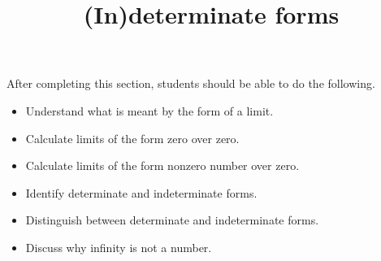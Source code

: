 \documentclass{ximera}
\title{(In)determinate forms}
\begin{document}
\begin{abstract}
\end{abstract}
\maketitle

\begin{sectionOutcomes}
After completing this section, students should be able to do the following.

\begin{itemize}
\item Understand what is meant by the form of a limit.
\item Calculate limits of the form zero over zero.
\item Calculate limits of the form nonzero number over zero.
\item Identify determinate and indeterminate forms.
\item Distinguish between determinate and indeterminate forms.
\item Discuss why infinity is not a number.
\end{itemize}
\end{sectionOutcomes}
\end{document}
